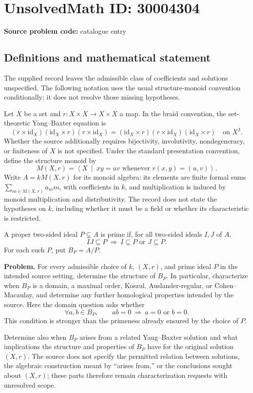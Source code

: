 \documentclass[11pt]{article}
\begin{document}
\section*{UnsolvedMath ID: 30004304}
\textbf{Source problem code:} catalogue entry
\subsection{Definitions and mathematical statement}
The supplied record leaves the admissible class of coefficients and solutions unspecified. The following notation uses the usual structure-monoid convention conditionally; it does not resolve those missing hypotheses.

Let \(X\) be a set and \(r\colon X\times X\to X\times X\) a map. In the braid convention, the set-theoretic Yang--Baxter equation is
\[
(r\times\mathrm{id}_X)(\mathrm{id}_X\times r)(r\times\mathrm{id}_X)
=
(\mathrm{id}_X\times r)(r\times\mathrm{id}_X)(\mathrm{id}_X\times r)
\quad\text{on }X^3.
\]
Whether the source additionally requires bijectivity, involutivity, nondegeneracy, or finiteness of \(X\) is not specified. Under the standard presentation convention, define the structure monoid by
\[
M(X,r)=\left\langle X\ \middle|\ xy=uv\text{ whenever }r(x,y)=(u,v)\right\rangle.
\]
Write \(A=kM(X,r)\) for its monoid algebra: its elements are finite formal sums \(\sum_{m\in M(X,r)}a_m m\), with coefficients in \(k\), and multiplication is induced by monoid multiplication and distributivity. The record does not state the hypotheses on \(k\), including whether it must be a field or whether its characteristic is restricted.

A proper two-sided ideal \(P\subsetneq A\) is prime if, for all two-sided ideals \(I,J\) of \(A\),
\[
IJ\subseteq P\ \Longrightarrow\ I\subseteq P\text{ or }J\subseteq P.
\]
For each such \(P\), put \(B_P=A/P\).

\textbf{Problem.} For every admissible choice of \(k\), \((X,r)\), and prime ideal \(P\) in the intended source setting, determine the structure of \(B_P\). In particular, characterize when \(B_P\) is a domain, a maximal order, Koszul, Auslander-regular, or Cohen--Macaulay, and determine any further homological properties intended by the source. Here the domain question asks whether
\[
\forall a,b\in B_P,\qquad ab=0\ \Longrightarrow\ a=0\text{ or }b=0.
\]
This condition is stronger than the primeness already ensured by the choice of \(P\).

Determine also when \(B_P\) arises from a related Yang--Baxter solution and what implications the structure and properties of \(B_P\) have for the original solution \((X,r)\). The source does not specify the permitted relation between solutions, the algebraic construction meant by ``arises from,'' or the conclusions sought about \((X,r)\); these parts therefore remain characterization requests with unresolved scope.
\end{document}
